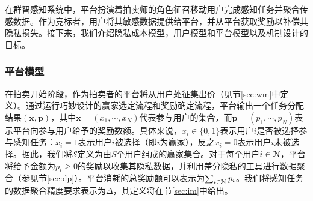 	在群智感知系统中，平台扮演着拍卖师的角色征召移动用户完成感知任务并聚合传感数据。作为竞标者，用户将其敏感数据提供给平台，并从平台获取奖励以补偿其隐私损失。接下来，我们介绍隐私成本模型，用户模型和平台模型以及机制设计的目标。
	
	\subsubsection{平台模型}
	在拍卖开始阶段，作为拍卖者的平台将从用户处征集出价（见节\ref{sec:wm}中定义）。通过运行巧妙设计的赢家选定流程和奖励确定流程，平台输出一个任务分配结果$(\mathbf{x},\mathbf{p})$，其中$\mathbf{x}=(x_{1},\cdots,x_{N})$代表参与用户的集合，而$\mathbf{p}=(p_{1},\cdots,p_{N})$表示平台向参与用户给予的奖励数额。具体来说，$x_i\in\{0,1\}$表示用户$i$是否被选择参与感知任务：$x_i=1$表示用户$i$被选择（即$i$为赢家），反之$x_i=0$表示用户$i$未被选择。据此，我们将$\mathcal{S}$定义为由$S$个用户组成的赢家集合。对于每个用户$i\in\mathcal{N}$，平台将给予金额为$p_{i}\ge0$的奖励以收集其隐私数据，并利用差分隐私的工具进行数据聚合（参见节\ref{sec:dp}）。平台消耗的总奖励额可以表示为$\sum_{i\in\mathcal{N}}p_i$。我们将感知任务的数据聚合精度要求表示为$\Delta$，其定义将在节\ref{sec:im}中给出。
	
